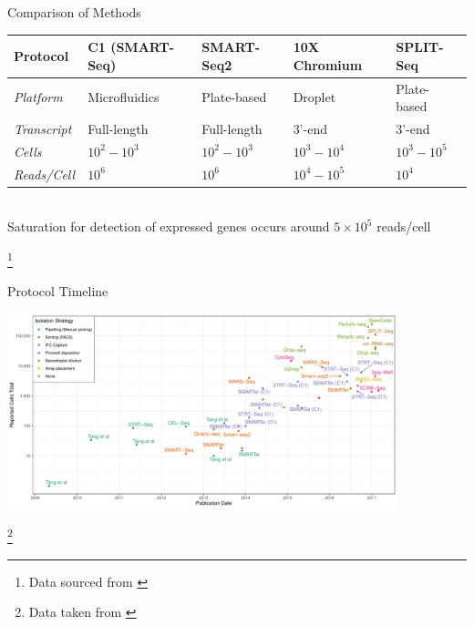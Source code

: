 \documentclass[aspectratio=169,11pt]{beamer}
\newcommand\blfootnote[1]{%
  \begingroup
  \renewcommand\thefootnote{}\footnote{#1}%
  \addtocounter{footnote}{-1}%
  \endgroup
}
\begin{document}
\begin{frame}{Comparison of Methods}

	\begin{center}
	
		\small
		\begin{tabular}{l|llll}
			\textbf{Protocol} & \textbf{C1 (SMART-Seq)} & \textbf{SMART-Seq2} & \textbf{10X Chromium} & \textbf{SPLIT-Seq}\\
			\midrule
			\textit{Platform} & Microfluidics & Plate-based & Droplet & Plate-based\\
			\textit{Transcript} & Full-length & Full-length & 3'-end & 3'-end\\
			\textit{Cells} & $10^2 - 10^3$ & $10^2 - 10^3$ & $10^3-10^4$ & $10^3 - 10^5$\\
			\textit{Reads/Cell} & $10^6$ & $10^6$ & $10^4-10^5$ & $10^4$\\
			\bottomrule
		\end{tabular}

	\end{center}
	\pause
	~\\[3mm]
	Saturation for detection of expressed genes occurs around $5\times10^5$ reads/cell

	\blfootnote{Data sourced from \cite{pmid28821273}}

\end{frame}

\begin{frame}{Protocol Timeline}

	\begin{center}
		\includegraphics[width=0.85\textwidth]{figures/scRNATimeline.pdf} 
	\end{center}

	\blfootnote{Data taken from \cite{pmid29494575}}

\end{frame}
\end{document}
